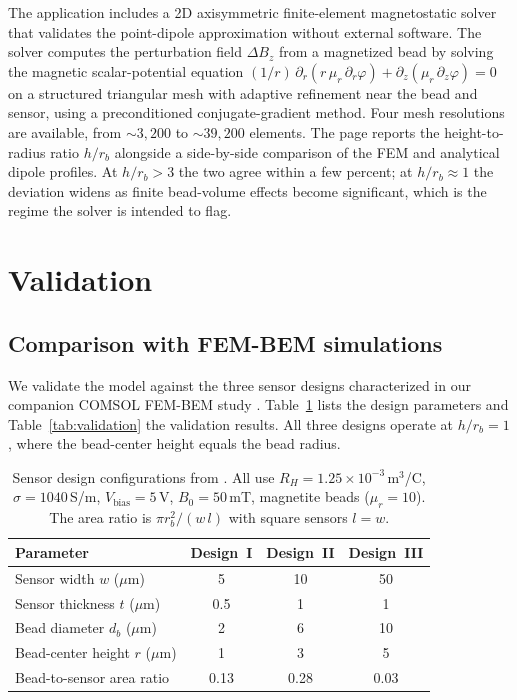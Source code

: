 \documentclass[pdflatex,sn-basic]{sn-jnl}
\theoremstyle{thmstyleone}
\theoremstyle{thmstyletwo}
\theoremstyle{thmstylethree}
\begin{document}
The application includes a 2D axisymmetric finite-element magnetostatic solver that validates the point-dipole approximation without external software. The solver computes the perturbation field $\Delta B_z$ from a magnetized bead by solving the magnetic scalar-potential equation $(1/r)\,\partial_r(r\,\mu_r\,\partial_r\varphi) + \partial_z(\mu_r\,\partial_z\varphi) = 0$ on a structured triangular mesh with adaptive refinement near the bead and sensor, using a preconditioned conjugate-gradient method. Four mesh resolutions are available, from ${\sim}3{,}200$ to ${\sim}39{,}200$ elements. The page reports the height-to-radius ratio $h/r_b$ alongside a side-by-side comparison of the FEM and analytical dipole profiles. At $h/r_b > 3$ the two agree within a few percent; at $h/r_b \approx 1$ the deviation widens as finite bead-volume effects become significant, which is the regime the solver is intended to flag.

\section{Validation}\label{sec:validation}

\subsection{Comparison with FEM-BEM simulations}\label{sec:femvalidation}

We validate the model against the three sensor designs characterized in our companion COMSOL FEM-BEM study \citep{govindaraju2025}. Table~\ref{tab:designs} lists the design parameters and Table~\ref{tab:validation} the validation results. All three designs operate at $h/r_b = 1$, where the bead-center height equals the bead radius.

\begin{table}[!htbp]
\caption{Sensor design configurations from \citet{govindaraju2025}. All use $R_H = 1.25\times10^{-3}$\,m$^3$/C, $\sigma = 1040$\,S/m, $V_{\text{bias}} = 5$\,V, $B_0 = 50$\,mT, magnetite beads ($\mu_r = 10$). The area ratio is $\pi r_b^2/(w\,l)$ with square sensors $l = w$.}
\label{tab:designs}
\centering
\footnotesize
\begin{tabular}{@{}lccc@{}}
\toprule
Parameter & Design~I & Design~II & Design~III \\
\midrule
Sensor width $w$ ($\mu$m) & 5 & 10 & 50 \\
Sensor thickness $t$ ($\mu$m) & 0.5 & 1 & 1 \\
Bead diameter $d_b$ ($\mu$m) & 2 & 6 & 10 \\
Bead-center height $r$ ($\mu$m) & 1 & 3 & 5 \\
Bead-to-sensor area ratio & 0.13 & 0.28 & 0.03 \\
\bottomrule
\end{tabular}
\end{table}
\end{document}
